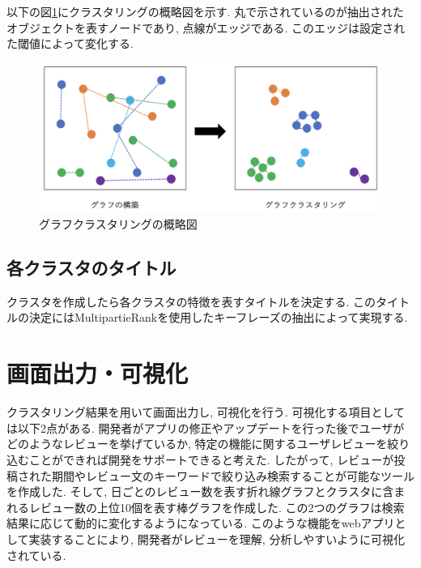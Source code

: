 以下の図\ref{fig:clustering}にクラスタリングの概略図を示す. 丸で示されているのが抽出されたオブジェクトを表すノードであり, 点線がエッジである. このエッジは設定された閾値によって変化する. 
\begin{figure}[hbtp]
  \centering
  \includegraphics[scale=0.4]
       {contents/images/clustering.png}
  \caption{グラフクラスタリングの概略図\label{fig:clustering}}
\end{figure}

\subsection{各クラスタのタイトル}
クラスタを作成したら各クラスタの特徴を表すタイトルを決定する. このタイトルの決定にはMultipartieRankを使用したキーフレーズの抽出によって実現する. 


\section{画面出力・可視化}
クラスタリング結果を用いて画面出力し, 可視化を行う. 可視化する項目としては以下2点がある. 開発者がアプリの修正やアップデートを行った後でユーザがどのようなレビューを挙げているか, 特定の機能に関するユーザレビューを絞り込むことができれば開発をサポートできると考えた. したがって, レビューが投稿された期間やレビュー文のキーワードで絞り込み検索することが可能なツールを作成した. そして, 日ごとのレビュー数を表す折れ線グラフとクラスタに含まれるレビュー数の上位10個を表す棒グラフを作成した. この2つのグラフは検索結果に応じて動的に変化するようになっている. 
このような機能をwebアプリとして実装することにより, 開発者がレビューを理解, 分析しやすいように可視化されている. 